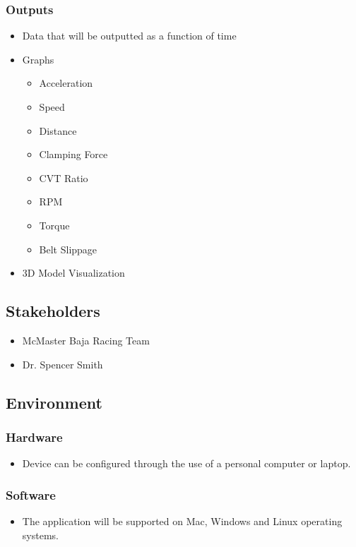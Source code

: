 \documentclass{article}
\begin{document}
\subsubsection{Outputs}
\begin{itemize}
    \item Data that will be outputted as a function of time
    \item Graphs
    \begin{itemize}
        \item Acceleration
        \item Speed
        \item Distance
        \item Clamping Force
        \item CVT Ratio
        \item RPM
        \item Torque
        \item Belt Slippage
    \end{itemize}
    \item 3D Model Visualization
\end{itemize}

\subsection{Stakeholders}
\begin{itemize}
    \item McMaster Baja Racing Team
    \item Dr. Spencer Smith
\end{itemize}

\subsection{Environment}
\subsubsection{Hardware}
\begin{itemize}
    \item Device can be configured through the use of a personal computer or laptop.
\end{itemize}
    \subsubsection{Software}
\begin{itemize}
    \item The application will be supported on Mac, Windows and Linux operating
    systems.
\end{itemize}
\end{document}
